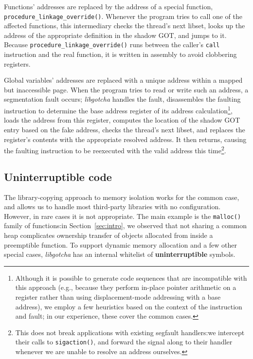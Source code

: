 Functions' addresses are replaced by the address of a special function,
\texttt{procedure\_linkage\_override()}.  Whenever the program tries to call one of
the affected functions, this intermediary checks the thread's next libset, looks up
the address of the appropriate definition in the shadow GOT, and jumps to it.
Because \texttt{procedure\_linkage\_override()} runs between the caller's
\texttt{call} instruction and the real function, it is written in assembly to avoid
clobbering registers.


Global variables' addresses are replaced with a unique address within a mapped but
inaccessible page.  When the program tries to read or write such an address, a
segmentation fault occurs; \textit{libgotcha} handles the fault, disassembles the
faulting instruction to determine the base address register of its address
calculation\footnote{Although it is possible to
generate code sequences that are incompatible with this approach (e.g., because they
perform in-place pointer arithmetic on a register rather than using displacement-mode
addressing with a base address), we employ a few heuristics based on the context of
the instruction and fault; in our experience, these cover the common cases.},
loads the address from this register, computes the location of the
shadow GOT entry based on the fake address, checks the thread's next libset, and
replaces the register's contents with the appropriate resolved address.  It then
returns, causing the faulting instruction to be reexecuted with the valid address
this time\footnote{This does not break applications with existing segfault
handlers:\@ we intercept their calls to \texttt{sigaction()}, and forward the signal
along to their handler whenever we are unable to resolve an address ourselves.}.



\subsection{Uninterruptible code}

The library-copying approach to memory isolation works for the common case, and
allows us to handle most third-party libraries with no configuration.  However, in
rare cases it is not appropriate.  The main example is the \texttt{malloc()} family
of functions:\@ in Section~\ref{sec:intro}, we observed that not sharing a common
heap complicates ownership transfer of objects allocated from inside a preemptible
function.  To support dynamic memory allocation and a few other special cases,
\textit{libgotcha} has an internal whitelist of \textbf{uninterruptible} symbols.

